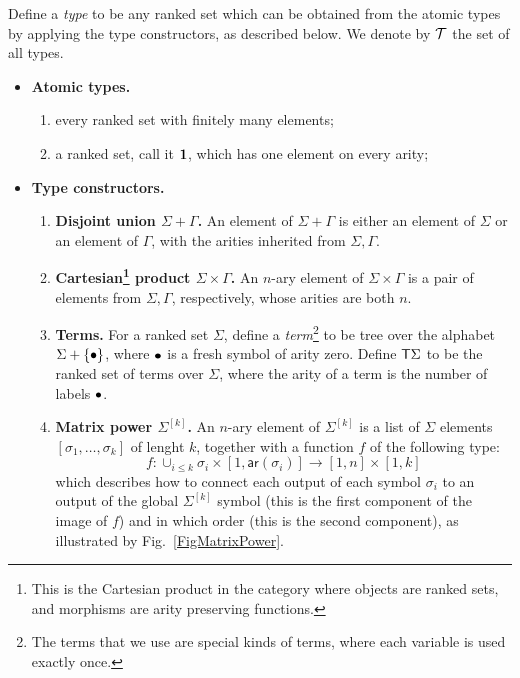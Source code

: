 \begin{definition}[Types]\label{def:types}
    Define a \emph{type} to be any ranked set which can be obtained from the atomic types by applying the type constructors, as described below. We denote by ${\mathcal T}$ the set of all types. 
    \begin{itemize}
        \item {\bf Atomic types.} 
           \begin{enumerate}
            \item every ranked set with finitely many elements;
            \item a ranked set, call it  $\mathbf{1}$, which has one element on every arity;
        \end{enumerate}
    \item {\bf Type constructors.} 
     \begin{enumerate}
        \item {\bf Disjoint union $\Sigma+\Gamma$.} An element of $\Sigma+\Gamma$ is either an element of $\Sigma$ or an element of $\Gamma$, with the arities inherited from $\Sigma,\Gamma$. 
        \item {\bf Cartesian\footnote{This is the Cartesian product in the category where objects are ranked sets, and morphisms are arity preserving functions.}  product $\Sigma \times \Gamma$.} An  $n$-ary element of $\Sigma \times \Gamma$ is a pair of elements from $\Sigma, \Gamma$, respectively, whose arities are both $n$.
        \item {\bf Terms.} For a ranked set  $\Sigma$, define a \emph{term}\footnote{The terms that we use are special kinds of terms, where each variable is used exactly once.} to be tree over the alphabet $\Sigma + \{\bullet\}$, where $\bullet$ is a fresh symbol of arity zero. Define $\mathsf T \Sigma$ to be the ranked set of terms over $\Sigma$, where the arity of a term is the number of labels $\bullet$.
\item {\bf Matrix power $\Sigma^{[k]}$.} An $n$-ary element of $\Sigma^{[k]}$ is a list of $\Sigma$ elements $[\sigma_1,\dots,\sigma_k]$ of lenght $k$, together with a function $f$ of the following type:
\[f: \cup_{i\leq k} \sigma_i\times [1, \mathsf{ar}(\sigma_i)]\to [1,n]\times [1,k]\]
which describes how to connect each output of each symbol $\sigma_i$ to an output of the global $\Sigma^{[k]}$ symbol (this is the first component of the image of $f$) and in which order (this is the second component), as illustrated by Fig.~\ref{FigMatrixPower}.


\end{enumerate}
\end{itemize}
\end{definition}

